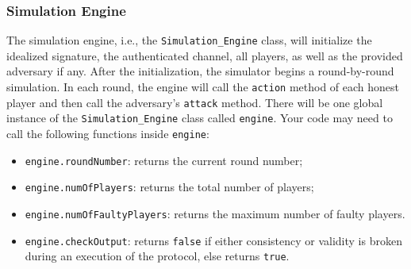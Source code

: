 \subsubsection{Simulation Engine}
The simulation engine, i.e., the {\tt Simulation\_Engine}
class, will initialize
the idealized signature, the authenticated
channel, all players, as well as the provided adversary if any.
After the initialization, the simulator begins a round-by-round simulation.
In each round, the engine will call the {\tt action} method of each honest player and then call the adversary's {\tt attack} method.
There will be one global instance of the {\tt Simulation\_Engine}
class called {\tt engine}.
Your code may need to call the following functions inside {\tt engine}:
\begin{itemize}[leftmargin=5mm]
    \item
          {\tt engine.roundNumber}:
          returns the current round number;
    \item
          {\tt engine.numOfPlayers}:
          returns the total number of players;
    \item
          {\tt engine.numOfFaultyPlayers}:
          returns the maximum number of faulty players.
    \item
          {\tt engine.checkOutput}:
          returns {\tt false} if either consistency or validity is broken during
          an execution of the protocol,
          else returns {\tt true}.

\end{itemize}


